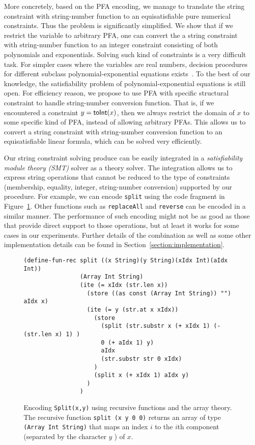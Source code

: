 \documentclass[sigplan,review,anonymous]{acmart}\settopmatter{printfolios=true,printccs=false,printacmref=false}
\begin{document}
More concretely, based on the PFA encoding, we manage to translate the string constraint with string-number function to an equisatisfiable pure numerical constraints. Thus the problem is significantly simplified. We show that if we restrict the variable to arbitrary PFA, one can convert the a string constraint with string-number function to an integer constraint consisting of both polynomials and exponentials. Solving such kind of constraints is a very difficult task. For simpler cases where the variables are real numbers, decision procedures for different subclass polynomial-exponential equations exists~\cite{gan2015decidability,kincaid2019closed,achatz2008deciding}. To the best of our knowledge, the satisfiability problem of polynomial-exponential equations is still open. For efficiency reason, we propose to use PFA with specific structural constraint to handle string-number conversion function. That is, if we encountered a constraint $y=\mbox{\textsf{toInt}($x$)}$, then we always restrict the domain of $x$ to some specific kind of PFA, instead of allowing arbitrary PFAs. This allows us to convert a string constraint with string-number conversion function to an equisatisfiable linear formula, which can be solved very efficiently. 

Our string constraint solving produce can be easily integrated in a \emph{satisfiability module theory (SMT)} solver as a theory solver. The integration allows us to express string operations that cannot be reduced to the type of constraints (membership, equality, integer, string-number conversion) supported by our procedure. For example, we can encode \texttt{split} using the code fragment in Figure~\ref{fig:smt_string}. Other functions such as \texttt{replaceAll} and \texttt{reverse} can be encoded in a similar manner. The performance of such encoding might not be as good as those that provide direct support to those operations, but at least it works for some cases in our experiments. Further details of the combination as well as some other implementation details can be found in Section~\ref{section:implementation}.

\begin{figure}
	\begin{Verbatim}[fontsize=\scriptsize,xleftmargin=-4cm]
				(define-fun-rec split ((x String)(y String)(xIdx Int)(aIdx Int)) 
				(Array Int String)
				(ite (= xIdx (str.len x))
				  (store ((as const (Array Int String)) "") aIdx x)
				  (ite (= y (str.at x xIdx)) 
				    (store 
				      (split (str.substr x (+ xIdx 1) (- (str.len x) 1) ) 
				      0 (+ aIdx 1) y) 
				      aIdx
				      (str.substr str 0 xIdx)
				    )
				    (split x (+ xIdx 1) aIdx y)
				  )
				)
			\end{Verbatim}
	 	 				
	 	\caption{Encoding \texttt{Split(x,y)} using recursive functions and the array theory. The recursive function \texttt{split (x y 0 0)} returns an array of type \texttt{(Array Int String)} that maps an index $i$ to the $i$th component (separated by the character $y$ ) of $x$.}
	 	\label{fig:smt_string}
\end{figure}
\end{document}
